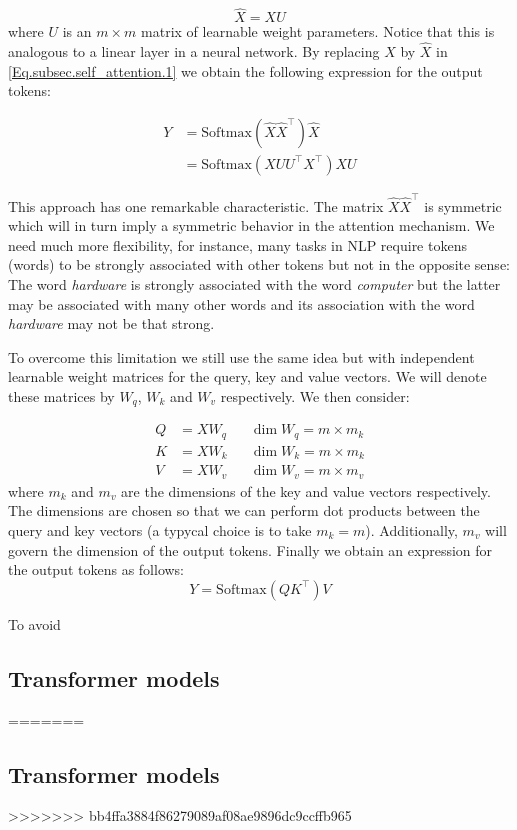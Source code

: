     \[ \widehat{X} = X U \]
    where $U$ is an $m \times m$ matrix of learnable weight parameters. Notice that this is analogous to a linear layer in a neural network. By replacing $X$ by $\widehat{X}$ in \eqref{Eq.subsec.self_attention.1} we obtain the following expression for the output tokens:

    \begin{align}\label{Eq.subsec.self_attention.2}
        Y &= \textrm{Softmax}(\widehat{X} \widehat{X}^\top) \widehat{X} \nonumber \\
        &= \textrm{Softmax}(X U U^\top X^\top) X U 
    \end{align}

    \begin{remark}
        This approach has one remarkable characteristic. The matrix $\widehat{X}\widehat{X}^\top$ is symmetric which will in turn imply a symmetric behavior in the attention mechanism. We need much more flexibility, for instance, many tasks in NLP require tokens (words) to be strongly associated with other tokens but not in the opposite sense: The word \textit{hardware} is strongly associated with the word \textit{computer} but the latter may be associated with many other words and its association with the word \textit{hardware} may not be that strong. 
    \end{remark}

    To overcome this limitation we still use the same idea but with independent learnable weight matrices for the query, key and value vectors. We will denote these matrices by $W_q$, $W_k$ and $W_v$ respectively. We then consider: 

    \begin{align*}
        Q &= X W_q  &&\dim W_q = m\times m_k \\ 
        K &= X W_k  &&\dim W_k = m\times m_k \\
        V &= X W_v &&\dim W_v = m\times m_v
    \end{align*}
    where $m_k$ and $m_v$ are the dimensions of the key and value vectors respectively. The dimensions are chosen so that we can perform dot products between the query and key vectors (a typycal choice is to take $m_k= m$). Additionally, $m_v$ will govern the dimension of the output tokens. Finally we obtain an expression for the output tokens as follows:
    \begin{equation}\label{Eq.subsec.self_attention.3}
        Y = \textrm{Softmax}(Q K^\top) V 
    \end{equation}
    
    \begin{remark}
        To avoid 
    \end{remark}
    \subsection{Transformer models}\label{subsec:transformer_models}
=======




\subsection{Transformer models}\label{subsec:transformer_models}
>>>>>>> bb4ffa3884f86279089af08ae9896dc9ccffb965
